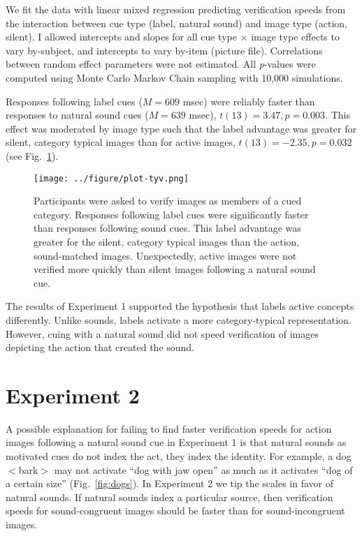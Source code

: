 \documentclass[12pt, titlepage]{article}
\begin{document}
We fit the data with linear mixed regression \cite{Bates:2013lme} predicting verification speeds from the interaction between cue type (label, natural sound) and image type (action, silent). I allowed intercepts and slopes for all cue type $\times$ image type effects to vary by-subject, and intercepts to vary by-item (picture file). Correlations between random effect parameters were not estimated. All \textit{p}-values were computed using Monte Carlo Markov Chain sampling with 10,000 simulations.

Responses following label cues ($M=609$ msec) were reliably faster than responses to natural sound cues ($M=639$ msec), $t(13)=3.47, p=0.003$. This effect was moderated by image type such that the label advantage was greater for silent, category typical images than for active images, $t(13)=-2.35, p=0.032$ (see Fig.~\ref{fig:tyv}).

\begin{figure}[h!]
	\centering
	\caption{Participants were asked to verify images as members of a cued category. Responses following label cues were significantly faster than responses following sound cues. This label advantage was greater for the silent, category typical images than the action, sound-matched images. Unexpectedly, active images were not verified more quickly than silent images following a natural sound cue.}
	\label{fig:tyv}
	\texttt{[image: ../figure/plot-tyv.png]}
\end{figure}

The results of Experiment 1 supported the hypothesis that labels active concepts differ\-ently\cite{Lupyan:2012cp}. Unlike sounds, labels activate a more category-typical representation. However, cuing with a natural sound did not speed verification of images depicting the action that created the sound.

\section{Experiment 2}
A possible explanation for failing to find faster verification speeds for action images following a natural sound cue in Experiment 1 is that natural sounds as motivated cues do not index the act, they index the identity. For example, a dog $<$bark$>$ may not activate ``dog with jaw open'' as much as it activates ``dog of a certain size'' (Fig.~\ref{fig:dogs}). In Experiment 2 we tip the scales in favor of natural sounds. If natural sounds index a particular source, then verification speeds for sound-congruent images should be faster than for sound-incongruent images.
\end{document}
